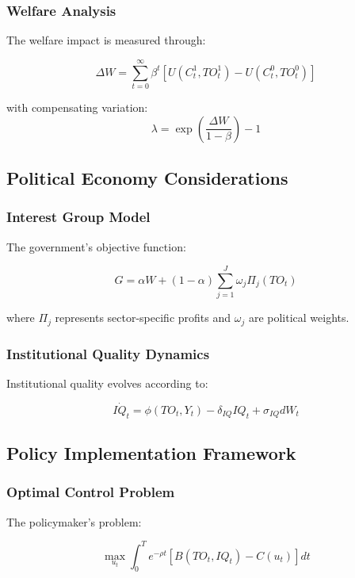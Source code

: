 \documentclass[12pt,a4paper]{article}
\theoremstyle{definition}
\begin{document}
\subsubsection{Welfare Analysis}
The welfare impact is measured through:

\begin{equation}
\Delta W = \sum_{t=0}^{\infty} \beta^t [U(C_t^1, TO_t^1) - U(C_t^0, TO_t^0)]
\end{equation}

with compensating variation:
\begin{equation}
\lambda = \exp\left(\frac{\Delta W}{1-\beta}\right) - 1
\end{equation}

\subsection{Political Economy Considerations}
\subsubsection{Interest Group Model}
The government's objective function:

\begin{equation}
G = \alpha W + (1-\alpha)\sum_{j=1}^J \omega_j \Pi_j(TO_t)
\end{equation}

where $\Pi_j$ represents sector-specific profits and $\omega_j$ are political weights.

\subsubsection{Institutional Quality Dynamics}
Institutional quality evolves according to:

\begin{equation}
\dot{IQ_t} = \phi(TO_t, Y_t) - \delta_{IQ} IQ_t + \sigma_{IQ} dW_t
\end{equation}

\subsection{Policy Implementation Framework}
\subsubsection{Optimal Control Problem}
The policymaker's problem:

\begin{equation}
\max_{u_t} \int_0^T e^{-\rho t}[B(TO_t, IQ_t) - C(u_t)]dt
\end{equation}
\end{document}
